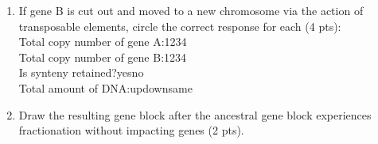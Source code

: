 \documentclass[]{article}
\begin{document}
\begin{enumerate}
\begin{enumerate}
Total copy number of gene A:\hspace{5mm}1\hspace{5mm}2\hspace{5mm}3\hspace{5mm}4\\
Total copy number of gene B:\hspace{5mm}1\hspace{5mm}2\hspace{5mm}3\hspace{5mm}4\\
Is synteny retained?\hspace{5mm}yes\hspace{5mm}no\\
Total amount of DNA:\hspace{5mm}up\hspace{5mm}down\hspace{5mm}same\\

\item If gene B is cut out and moved to a new chromosome via the action of transposable elements, circle the correct response for each (4 pts):\\

Total copy number of gene A:\hspace{5mm}1\hspace{5mm}2\hspace{5mm}3\hspace{5mm}4\\
Total copy number of gene B:\hspace{5mm}1\hspace{5mm}2\hspace{5mm}3\hspace{5mm}4\\
Is synteny retained?\hspace{5mm}yes\hspace{5mm}no\\
Total amount of DNA:\hspace{5mm}up\hspace{5mm}down\hspace{5mm}same\\
\item Draw the resulting gene block after the ancestral gene block experiences fractionation without impacting genes (2 pts).
\end{enumerate}


\end{enumerate}
\end{document}
